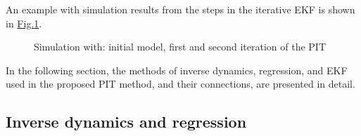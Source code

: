 \documentclass[review]{elsarticle}
\begin{document}
  
An example with simulation results from the steps in the iterative EKF is shown in \hyperref[\detokenize{01.01_method:iterations}]{Fig.\@ \ref{\detokenize{01.01_method:iterations}}}.

\begin{figure}[H]
\centering
\capstart

\noindent{}
\caption{Simulation with: initial model, first and second iteration of the PIT}\label{\detokenize{01.01_method:iterations}}\end{figure}

  
In the following section, the methods of inverse dynamics, regression, and EKF used in the proposed PIT method, and their connections, are presented in detail.


\subsection{Inverse dynamics and regression}
\label{\detokenize{03.01_inverse_dynamics:inverse-dynamics-and-regression}}\label{\detokenize{03.01_inverse_dynamics::doc}}
  
\end{document}
